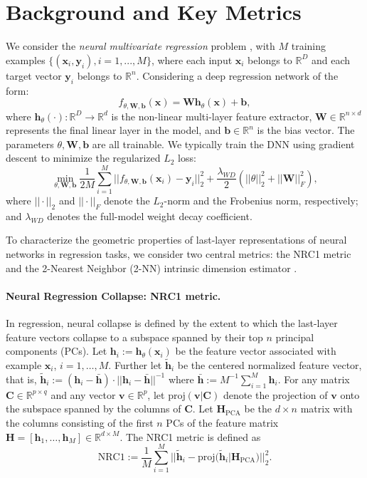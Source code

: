 \documentclass{article}
\newcommand{\bW}{{\mathbf W}}
\newcommand{\bH}{{\mathbf H}}
\newcommand{\bC}{{\mathbf C}}
\newcommand{\bh}{{\mathbf h}}
\newcommand{\by}{{\mathbf y}}
\newcommand{\bx}{{\mathbf x}}
\newcommand{\bb}{{\mathbf b}}
\newcommand{\bv}{{\mathbf v}}
\theoremstyle{plain}
\theoremstyle{definition}
\theoremstyle{remark}
\begin{document}
\section{Background and Key Metrics} \label{sec:preliminary}
We consider the \emph{neural multivariate regression} problem \citep{andriopoulos2024prevalence}, with $M$ training examples $\{(\bx_i, \by_i), i=1,...,M\}$, where each input $\bx_i$ belongs to $\mathbb{R}^D$ and each target vector $\by_i$ belongs to $\mathbb{R}^n$. Considering a deep regression network of the form:
\[
f_{\theta, \bW, \bb}(\bx)=\bW \bh_{\theta}(\bx)+\bb,
\]
where $\bh_{\theta}(\cdot):\mathbb{R}^D\to \mathbb{R}^d$ is the non-linear multi-layer feature extractor, $\bW\in\mathbb{R}^{n\times d}$ represents the final linear layer in the model, and $\bb\in \mathbb{R}^n$ is the bias vector. The parameters $\theta, \bW, \bb$ are all trainable. We typically train the DNN using gradient descent to minimize the regularized $L_2$ loss:
\[
\min_{\theta, \bW, \bb} \frac{1}{2M} \sum_{i=1}^M ||f_{\theta, \bW, \bb}(\bx_i)-\by_i||_2^2+\frac{\lambda_{WD}}{2}(||\theta||_2^2+||\bW||_F^2),
\]
where $||\cdot||_2$ and $||\cdot||_F$ denote the $L_2$-norm and the Frobenius norm, respectively; and $\lambda_{WD}$ denotes the full-model weight decay coefficient.

To characterize the geometric properties of last-layer representations of neural networks in regression tasks, we consider two central metrics: the NRC1 metric \citep{andriopoulos2024prevalence} and the 2-Nearest Neighbor (2-NN) intrinsic dimension estimator \citep{facco2017estimating}.

\paragraph{Neural Regression Collapse: NRC1 metric.} \label{nrc1} In regression, neural collapse is defined by the extent to which the last-layer feature vectors collapse to a subspace spanned by their top $n$ principal components (PCs). Let $\bh_i:=\bh_{\theta}(\bx_i)$ be the feature vector associated with example $\bx_i$, $i=1,\ldots,M$. %
Further let $\widetilde{\bh}_i$ be the centered normalized feature vector, that is, $\widetilde{\bh}_i:=(\bh_i-\bar{\bh})\cdot ||\bh_i-\bar{\bh}||^{-1}$ where $\bar{\bh}:=M^{-1}\sum_{i=1}^M \bh_i$. For any matrix $\bC \in \mathbb{R}^{p\times q}$ and any vector $\bv \in \mathbb{R}^p$, let $\text{proj}(\bv|\bC)$ denote the projection of $\bv$ onto the subspace spanned by the columns of $\bC$. Let $\bH_{\text{PCA}}$ be the $d\times n$ matrix with the columns consisting of the first $n$ PCs of the feature matrix $\bH = [\bh_1,\dots, \bh_M] \in \mathbb{R}^{d\times M}$. The NRC1 metric is defined as
\begin{displaymath}
\text{NRC1}:=\frac{1}{M} \sum_{i=1}^M ||\widetilde{\bh}_i-\text{proj}(\widetilde{\bh}_i|\bH_{\text{PCA}})||_2^2 .
\end{displaymath} 
\end{document}
